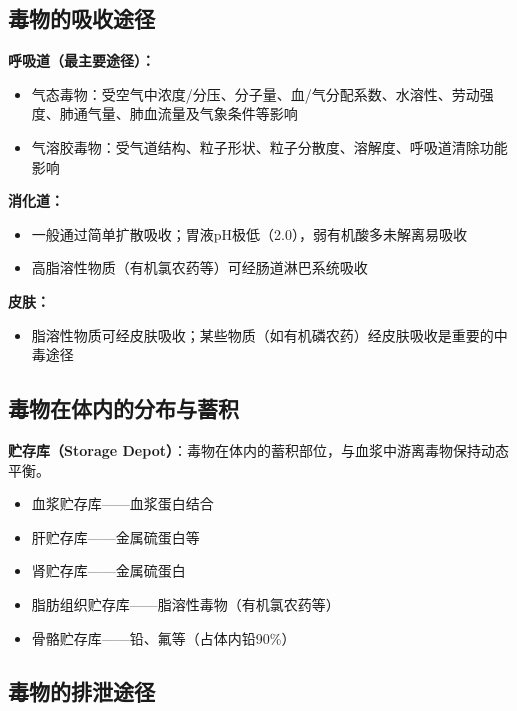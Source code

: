 \subsection{毒物的吸收途径}

\begin{keybox}
\textbf{呼吸道（最主要途径）：}
\begin{itemize}[leftmargin=*]
    \item 气态毒物：受空气中浓度/分压、分子量、血/气分配系数、水溶性、劳动强度、肺通气量、肺血流量及气象条件等影响
    \item 气溶胶毒物：受气道结构、粒子形状、粒子分散度、溶解度、呼吸道清除功能影响
\end{itemize}

\textbf{消化道：}
\begin{itemize}[leftmargin=*]
    \item 一般通过简单扩散吸收；胃液pH极低（2.0），弱有机酸多未解离易吸收
    \item 高脂溶性物质（有机氯农药等）可经肠道淋巴系统吸收
\end{itemize}

\textbf{皮肤：}
\begin{itemize}[leftmargin=*]
    \item 脂溶性物质可经皮肤吸收；某些物质（如有机磷农药）经皮肤吸收是重要的中毒途径
\end{itemize}
\end{keybox}

\subsection{毒物在体内的分布与蓄积}

\begin{defbox}
\textbf{贮存库（Storage Depot）}：毒物在体内的蓄积部位，与血浆中游离毒物保持动态平衡。
\begin{itemize}[leftmargin=*]
    \item 血浆贮存库——血浆蛋白结合
    \item 肝贮存库——金属硫蛋白等
    \item 肾贮存库——金属硫蛋白
    \item 脂肪组织贮存库——脂溶性毒物（有机氯农药等）
    \item 骨骼贮存库——铅、氟等（占体内铅90\%）
\end{itemize}
\end{defbox}

\subsection{毒物的排泄途径}

